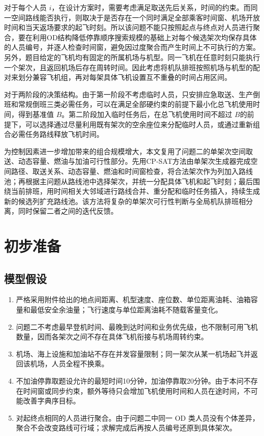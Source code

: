 \documentclass[UTF-8,a4paper,zihao=-4]{ctexart}
\begin{document}
对于每个人员 $i$，在设计方案时，需要考虑满足取送先后关系，时间的约束。而同一空间路线能否执行，则取决于是否存在一个同时满足全部乘客时间窗、机场开放时间和当天返场要求的起飞时刻。所以该问题不能只按照起点与终点对人员进行聚合，要在利用OD结构降低停靠顺序搜索规模的基础上对每个候选架次均保存具体的人员编号，并逐人检查时间窗，避免因过度聚合而产生时间上不可执行的方案。另外，题目给定的飞机均有固定的所属机场与机型。同一飞机在任意时刻只能执行一个架次，且返回机场后存在周转时间。因此考虑将机队排班按照机场与机型的配对来划分兼容飞机组，再对每架具体飞机设置互不重叠的时间占用区间。

对于两阶段的决策结构。由于第一阶段不考虑临时人员，只安排应急取送、生产倒班和常规倒班三类必需任务，可以在满足全部硬约束的前提下最小化总飞机使用时间，得到基准值 $B$。第二阶段加入临时任务后，在总飞机使用时间不超过 $B$的前提下，可以选择通过尽量利用既有架次的空余座位来分配临时人员，或通过重新组合必需任务路线释放飞机时间。

为控制因素进一步增加带来的组合规模增大，本文复用了问题二的单架次空间取送、动态容量、燃油与加油可行性部分。先用CP-SAT方法由单架次生成器完成空间路径、取送关系、动态容量、燃油和时间窗检查，将合法架次作为列加入路线池；再根据主问题从路线池中选择架次，并统一分配具体飞机和起飞时刻；最后围绕当前排班，用时间相关大邻域进行路线合并、重分配和临时任务插入，持续生成新的候选列扩充路线池。该方法将复杂的单架次可行性判断与全局机队排班相分离，同时保留二者之间的迭代反馈。

\section{初步准备}
\subsection{模型假设}
\begin{enumerate}
    \item 严格采用附件给出的地点间距离、机型速度、座位数、单位距离油耗、油箱容量和最低安全余油量；飞行速度与单位距离油耗不随载客量变化。
    \item 问题二不考虑最早登机时间、最晚到达时间和业务优先级，也不限制可用飞机数量，因而各架次之间不存在具体飞机衔接与机场周转约束。
    \item 机场、海上设施和加油站不存在并发容量限制；同一架次从某一机场起飞并返回该机场，人员全程不换乘。
    \item 不加油停靠取题设允许的最短时间10分钟，加油停靠取20分钟。由于本问不存在时间窗或同步约束，额外等待只会增加飞机使用时间和人员在途时间，不可能改善字典序目标。
    \item 对起终点相同的人员进行聚合。由于问题二中同一 OD 类人员没有个体差异，聚合不会改变路线可行域；求解完成后再按人员编号还原到具体架次。
\end{enumerate}
\end{document}
